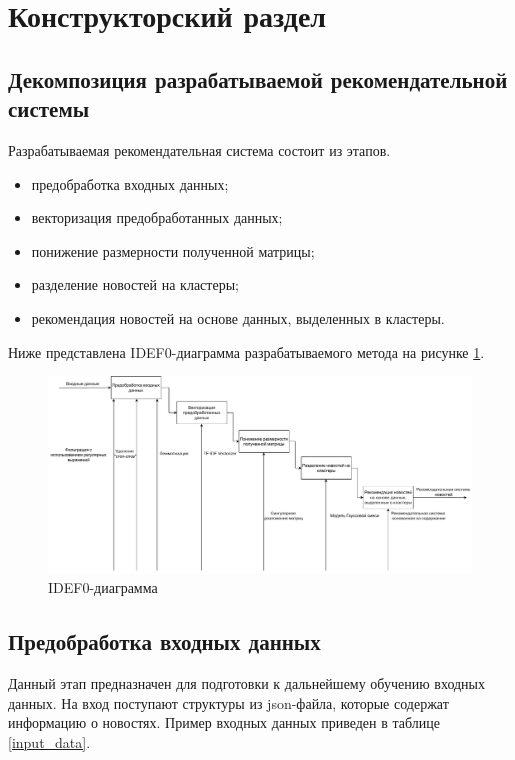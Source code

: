 \section{Конструкторский раздел}

\subsection{Декомпозиция разрабатываемой рекомендательной системы}

Разрабатываемая рекомендательная система состоит из этапов.

\begin{itemize}
	\item предобработка входных данных;
	\item векторизация предобработанных данных;
	\item понижение размерности полученной матрицы;
	\item разделение новостей на кластеры;
	\item рекомендация новостей на основе данных, выделенных в кластеры.
\end{itemize}

Ниже представлена IDEF0-диаграмма разрабатываемого метода на рисунке \ref{idef0_big}.

\begin{figure}[H]
	\centering
	\includegraphics[width=\textwidth]{img/idef0_big.pdf}
	\caption{IDEF0-диаграмма}
	\label{idef0_big}
\end{figure}  

\subsection{Предобработка входных данных}

Данный этап предназначен для подготовки к дальнейшему обучению входных данных. На вход поступают структуры из json-файла, которые содержат информацию о новостях. Пример входных данных приведен в таблице \ref{input_data}.

